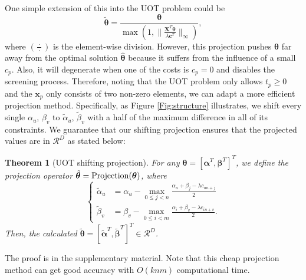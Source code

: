 \documentclass[twoside]{article}
\theoremstyle{plain}
\newtheorem{thm}{Theorem}
\newcommand{\mat}[1]{\mathbf{#1}}
\renewcommand{\vec}[1]{\bm{#1}}
\begin{document}
One simple extension of this into the UOT problem could be  
\begin{equation*}
\tilde{\vec{\theta}} = \frac{\vec\theta}{\max(1, \|\frac{\mat{X}^T\vec\theta}{\lambda \vec{c}^{T}}\|_{\infty})}, 
\end{equation*}
where $(\frac{\ \cdot\ }{\cdot})$ is the element-wise division. However, this projection pushes $\vec{\theta}$ far away from the optimal solution $\hat{\vec{\theta}}$ because it suffers from the influence of a small $c_p$. Also, it will degenerate when one of the costs is $c_p = 0$ and disables the screening process. 
%
Therefore, noting that the UOT problem only allows $t_p \geq 0$ and the $\vec{x}_p$ only consists of two non-zero elements, we can adapt a more efficient projection method. Specifically, as Figure \ref{Fig:structure} illustrates, we shift every single $\alpha_u$, $\beta_v$ to $\tilde{\alpha}_u$, $\tilde{\beta}_v$ with a half of the maximum difference in all of its constraints. We guarantee that our shifting projection ensures that the projected values are in $\mathcal{R}^{D}$ as stated below:
%
\begin{thm}[UOT shifting projection]
\label{Thm:UOT_ShiftProjection}
For any $\vec{\theta} = [{\vec{\alpha}}^T,{\vec{\beta}}^T]^T$, we define the projection operator $\tilde{\vec{\theta}}={\rm Projection}(\vec{\theta})$, where 
\begin{equation}
\left\{
\begin{array}{ll}
\label{eq:uotproj}
\tilde{{\alpha}}_u &= \displaystyle{{{\alpha}}_u - \max_{0\leq j < n} \frac{{{\alpha}}_u +{{\beta}}_j - \lambda{c}_{un+j}}{2}} \\
\tilde{{\beta}}_v &= \displaystyle{{{\beta}}_v - \max_{0 \leq i < m} \frac{{{\alpha}}_i +{{\beta}}_v - \lambda{c}_{in+v}}{2}}.
\end{array}
\right.
\end{equation}
Then, the calculated $\tilde{\vec{\theta}} = [\tilde{\vec{\alpha}}^T,\tilde{\vec{\beta}}^T]^T \in \mathcal{R}^{D}$.
\end{thm}
The proof is in the supplementary material. Note that this cheap projection method can get good accuracy with $O(knm)$ computational time. 
\end{document}
